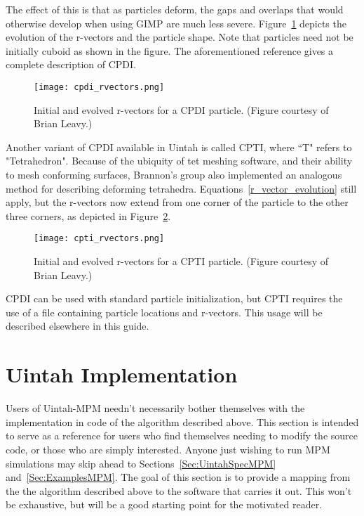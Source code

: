 The effect of this is that as particles deform, the gaps and overlaps that would
otherwise develop when using GIMP are much less severe.
Figure~\ref{Fig:CPDI_figures} depicts the evolution of the r-vectors and the
particle shape.  Note that particles need not be initially cuboid as shown
in the figure.  The aforementioned
reference gives a complete description of CPDI.

\begin{figure}
\centering
  \texttt{[image: cpdi\_rvectors.png]}
  \caption{Initial and evolved r-vectors for a CPDI particle.  (Figure courtesy of Brian Leavy.)}
  \label{Fig:CPDI_figures}
\end{figure}

Another variant of CPDI available in Uintah is called CPTI, where ``T"
refers to "Tetrahedron".  Because of the ubiquity of tet meshing software,
and their ability to mesh conforming surfaces, Brannon's group also implemented
an analogous method for describing deforming tetrahedra.  Equations~\ref{r_vector_evolution} still apply, but the r-vectors now extend from one corner
of the particle to the other three corners, as depicted in
Figure~\ref{Fig:CPTI_figures}.

\begin{figure}
\centering
  \texttt{[image: cpti\_rvectors.png]}
  \caption{Initial and evolved r-vectors for a CPTI particle. (Figure courtesy of Brian Leavy.)}
  \label{Fig:CPTI_figures}
\end{figure}

CPDI can be used with standard particle initialization, but CPTI requires
the use of a file containing particle locations and r-vectors.  This usage
will be described elsewhere in this guide.


\section{Uintah Implementation} \label{Sec:UintahImp}

Users of Uintah-MPM needn't necessarily bother themselves with the
implementation in code of the algorithm described above.  This section
is intended to serve as a reference for users who find themselves needing
to modify the source code, or those who are simply interested.  Anyone
just wishing to run MPM simulations may skip ahead to
Sections~\ref{Sec:UintahSpecMPM} and~\ref{Sec:ExamplesMPM}.  The goal of
this section is to provide a mapping from the the algorithm described above
to the software that carries it out.  This won't be exhaustive, but will be a
good starting point for the motivated reader.

